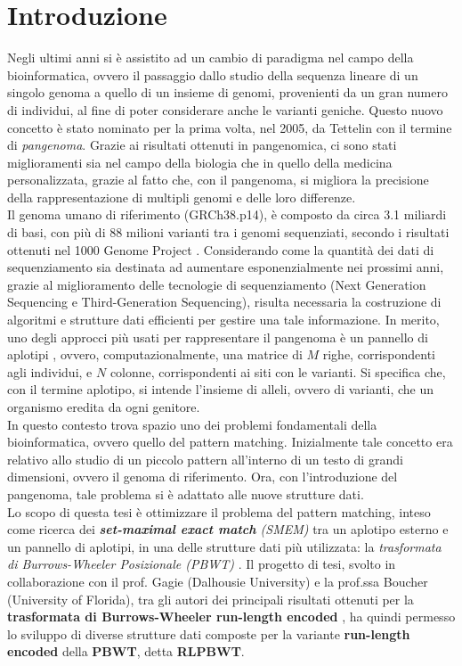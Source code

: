 \documentclass[a4paper,12pt, oneside, draft]{book}
\begin{document}
\chapter{Introduzione}
Negli ultimi anni si è assistito ad un cambio di paradigma nel campo della
bioinformatica, ovvero il passaggio dallo studio della sequenza lineare di un
singolo genoma a quello di un insieme di genomi, provenienti da un gran numero
di individui, al fine di poter considerare anche le varianti
geniche. Questo nuovo concetto è stato nominato per la prima volta, nel 2005,
da Tettelin \cite{tettelin} con il termine di \textit{pangenoma}. Grazie ai
risultati ottenuti in pangenomica, ci sono stati miglioramenti sia nel 
campo della biologia che in quello della medicina personalizzata, grazie al
fatto che, con il pangenoma, si migliora la precisione della rappresentazione di
multipli genomi e delle loro differenze. \\
Il genoma umano di riferimento (GRCh38.p14), è composto da circa
3.1 miliardi di basi, con più di 88 milioni 
varianti tra i genomi sequenziati, secondo i risultati ottenuti nel 1000 Genome
Project \cite{tutorial}. Considerando come la quantità dei dati di
sequenziamento sia destinata 
ad aumentare esponenzialmente nei prossimi anni, grazie al
miglioramento delle tecnologie di sequenziamento (Next Generation Sequencing e
Third-Generation Sequencing), risulta necessaria la costruzione di algoritmi e
strutture dati efficienti per gestire una tale informazione. 
In merito, uno degli approcci più usati per rappresentare il pangenoma è un
pannello di aplotipi \cite{pancon}, ovvero, computazionalmente, una matrice di
$M$ righe, corrispondenti agli individui, e $N$ colonne, corrispondenti ai siti
con le varianti. Si specifica che, con il termine
aplotipo, si intende l'insieme di alleli, ovvero di varianti, che un organismo
eredita da ogni genitore.\\
In questo contesto trova spazio uno dei problemi fondamentali della
bioinformatica, ovvero quello del pattern matching. Inizialmente tale concetto
era relativo allo studio di un piccolo pattern all'interno di un testo di
grandi dimensioni, ovvero il genoma di riferimento. Ora, con l'introduzione 
del pangenoma, tale problema si è adattato alle nuove strutture
dati.\\
Lo scopo di questa tesi è ottimizzare il problema del pattern 
matching, inteso come ricerca dei \textit{\textbf{set-maximal exact match}
  (SMEM)} tra un aplotipo 
esterno e un pannello di aplotipi, in una delle 
strutture dati più utilizzata: la \textit{trasformata di Burrows-Wheeler
  Posizionale (PBWT)} \cite{pbwt}. Il progetto di tesi, svolto in collaborazione
con il 
prof. Gagie (Dalhousie University) e la prof.ssa Boucher 
(University of Florida), tra gli autori dei principali risultati ottenuti per la
\textbf{trasformata di Burrows-Wheeler run-length encoded} \cite{rlbwt}
\cite{gagie2020} \cite{moni} \cite{phoni}, ha quindi permesso lo sviluppo di
diverse strutture dati composte per la variante 
\textbf{run-length encoded} della \textbf{PBWT}, detta \textbf{RLPBWT}.
\end{document}
